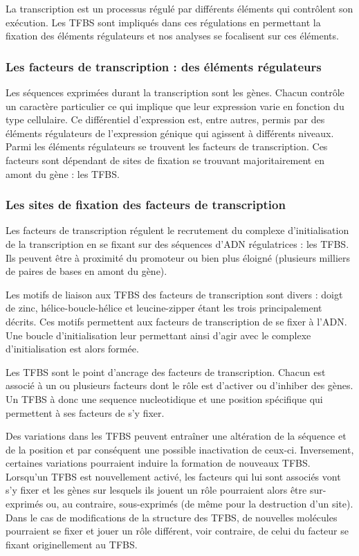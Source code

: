 La transcription est un processus régulé par différents éléments qui contrôlent son exécution. Les TFBS sont impliqués dans ces régulations en permettant la fixation des éléments régulateurs et nos analyses se focalisent sur ces éléments.

\subsubsection{Les facteurs de transcription : des éléments régulateurs} \label{subsec:regul}

Les séquences exprimées durant la transcription sont les gènes. Chacun contrôle un caractère particulier ce qui implique que leur expression varie en fonction du type cellulaire. Ce différentiel d'expression est, entre autres, permis par des éléments régulateurs de l'expression génique qui agissent à différents niveaux. Parmi les éléments régulateurs se trouvent les facteurs de transcription. Ces facteurs sont dépendant de sites de fixation se trouvant majoritairement en amont du gène : les TFBS.

\subsubsection{Les sites de fixation des facteurs de transcription}\label{subsec:TFBS}

Les facteurs de transcription régulent le recrutement du complexe d'initialisation de la transcription en se fixant sur des séquences d'ADN régulatrices : les TFBS. Ils peuvent être à proximité du promoteur ou bien plus éloigné (plusieurs milliers de paires de bases en amont du gène).

Les motifs de liaison aux TFBS des facteurs de transcription sont divers : doigt de zinc, hélice-boucle-hélice et leucine-zipper étant les trois principalement décrits. Ces motifs permettent aux facteurs de transcription de se fixer à l'ADN. Une boucle d'initialisation leur permettant ainsi d'agir avec le complexe d'initialisation est alors formée.

Les TFBS sont le point d'ancrage des facteurs de transcription. Chacun est associé à un ou plusieurs facteurs dont le rôle est d'activer ou d'inhiber des gènes. Un TFBS à donc une \gls{sequence nucleotidique} et une position spécifique qui permettent à ses facteurs de s'y fixer.

Des variations dans les TFBS peuvent entraîner une altération de la séquence et de la position et par conséquent une possible inactivation de ceux-ci. Inversement, certaines variations pourraient induire la formation de nouveaux TFBS. Lorsqu'un  TFBS est nouvellement activé, les facteurs qui lui sont associés vont s'y fixer et les gènes sur lesquels ils jouent un rôle pourraient alors être sur-exprimés ou, au contraire, sous-exprimés (de même pour la destruction d'un site). Dans le cas de modifications de la structure des TFBS, de nouvelles molécules pourraient se fixer et jouer un rôle différent, voir contraire, de celui du facteur se fixant originellement au TFBS.

